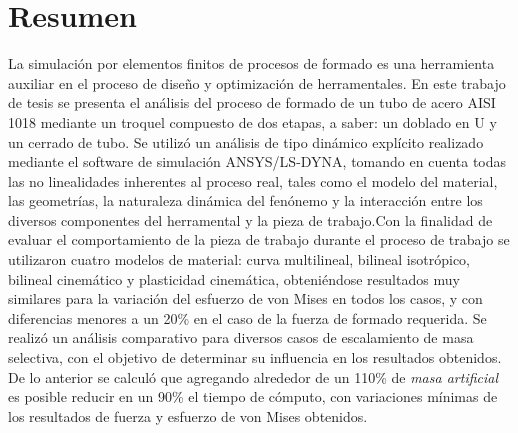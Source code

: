 \chapter*{Resumen}


La simulación por elementos finitos de procesos de formado es una herramienta auxiliar en el proceso de 
diseño y optimización de herramentales. En este trabajo de tesis se presenta el análisis del proceso de formado 
de un tubo de acero AISI 1018 mediante un troquel compuesto de dos etapas, a saber: un doblado en U y un 
cerrado de tubo. Se utilizó un análisis de tipo dinámico explícito realizado mediante el software de simulación 
ANSYS/LS-DYNA\CR, tomando en cuenta todas las no linealidades inherentes al proceso real, tales 
como el modelo del material, las geometrías, la naturaleza dinámica del fenónemo y la interacción 
entre los diversos componentes del herramental y la pieza de trabajo.Con la finalidad de evaluar el comportamiento de la pieza de trabajo durante el proceso de trabajo se utilizaron cuatro modelos de material: curva multilineal, bilineal isotrópico, bilineal cinemático y plasticidad cinemática, obteniéndose resultados muy similares para la variación del esfuerzo de 
von Mises en todos los casos, y con diferencias menores a un 20\% en el caso de la fuerza de formado requerida. 
Se realizó un análisis comparativo para diversos casos de escalamiento de masa selectiva, con el objetivo 
de determinar su influencia en los resultados obtenidos. De lo anterior se calculó que agregando alrededor de 
un 110\% de \textit{masa artificial} es posible reducir en un 90\% el tiempo de cómputo, con variaciones mínimas 
de los resultados de fuerza y esfuerzo de von Mises obtenidos.
